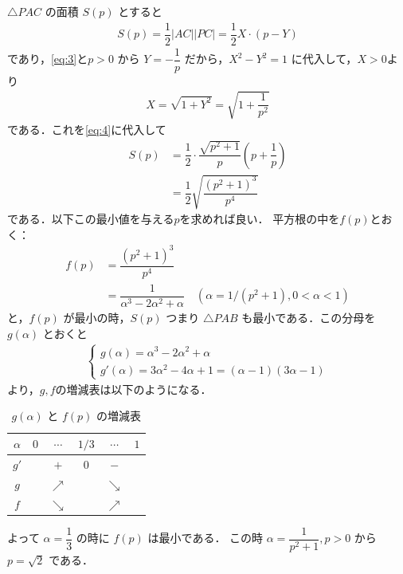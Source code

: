 \documentclass[../../main.tex]{subfiles}
\begin{document}
$\triangle PAC$ の面積 $S(p)$ とすると
\begin{align}
  S(p) = \dfrac{1}{2}|AC||PC| = \dfrac{1}{2}X \cdot (p-Y) \label{eq:4}
\end{align}
であり，\cref{eq:3}と$p>0$ から $Y = -\dfrac{1}{p}$ だから，$X^2-Y^2=1$ に代入して，$X>0$より
\begin{align}
  X = \sqrt{1+Y^2} = \sqrt{1+\dfrac{1}{p^2}} \label{eq:5}
\end{align}
である．これを\cref{eq:4}に代入して
\begin{align}
  S(p)
  &= \dfrac{1}{2} \cdot \dfrac{\sqrt{p^2+1}}{p}\left(p+\dfrac{1}{p}\right) \\
  &= \dfrac{1}{2} \sqrt{\dfrac{(p^2+1)^3}{p^4}}
\end{align}
である．以下この最小値を与える$p$を求めれば良い．
平方根の中を$f(p)$とおく：
\begin{align}
  f(p)
  &= \dfrac{(p^2+1)^3}{p^4} \\
  &= \dfrac{1}{\alpha^3-2\alpha^2+\alpha} \quad (\alpha=1/(p^2+1), 0<\alpha<1)
\end{align}
と，$f(p)$ が最小の時，$S(p)$ つまり $\triangle PAB$ も最小である．この分母を $g(\alpha)$ とおくと
\begin{align}
  \begin{cases}
    g(\alpha) = \alpha^3-2\alpha^2+\alpha \\
    g'(\alpha) = 3\alpha^2-4\alpha+1 = (\alpha-1)(3\alpha-1)
  \end{cases}
\end{align}
より，$g, f$の増減表は以下のようになる．

\begin{table}[htb]
  \centering
  \caption{$g(\alpha)$ と $f(p)$ の増減表}
  \begin{tabular}{|c|c|c|c|c|c|}
    \hline
    $\alpha$ & $0$ & $\cdots$ & $1/3$ & $\cdots$ & $1$ \\
    \hline
    $g'$ & & $+$ & $0$ & $-$ & \\
    \hline
    $g$ & & $\nearrow$ & & $\searrow$ & \\
    \hline
    $f$ & & $\searrow$ & & $\nearrow$ & \\
    \hline
  \end{tabular}
\end{table}

よって $\alpha = \dfrac{1}{3}$ の時に $f(p)$ は最小である．
この時 $\alpha = \dfrac{1}{p^2+1}, p>0$ から $p = \sqrt{2}$ である．
\end{document}
